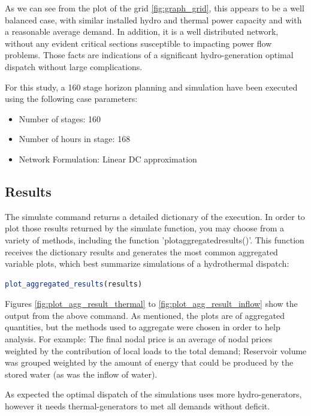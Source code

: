 \documentclass{juliacon}
\begin{document}
As we can see from the plot of the grid \ref{fig:graph_grid}, this appears to be a well balanced case, with similar installed hydro and thermal power capacity and with a reasonable average demand. In addition, it is a well distributed network, without any evident critical sections susceptible to impacting power flow problems. Those facts are indications of a significant hydro-generation optimal dispatch without large complications.

For this study, a 160 stage horizon planning and simulation have been executed using the following case parameters:

\begin{itemize}
    \item Number of stages: 160
    \item Number of hours in stage: 168 
    \item Network Formulation: Linear DC approximation
\end{itemize}

\subsection{Results} %

The simulate command returns a detailed dictionary of the execution. In order to plot those results returned by the simulate function, you may choose from a variety of methods, including the function ’plot\underline{\space}aggregated\underline{\space}results()’. This function receives the dictionary results and generates the most common aggregated variable plots, which best summarize simulations of a hydrothermal dispatch:

\begin{lstlisting}[language = Julia]
plot_aggregated_results(results)
\end{lstlisting}

Figures \ref{fig:plot_agg_result_thermal} to \ref{fig:plot_agg_result_inflow} show the output from the above command. As mentioned, the plots are of aggregated quantities, but the methods used to aggregate were chosen in order to help analysis. For example: The final nodal price is an average of nodal prices weighted by the contribution of local loads to the total demand; Reservoir volume was grouped weighted by the amount of energy that could be produced by the stored water (as was the inflow of water). 

As expected the optimal dispatch of the simulations uses more hydro-generators, however it needs thermal-generators to met all demands without deficit.
\end{document}
